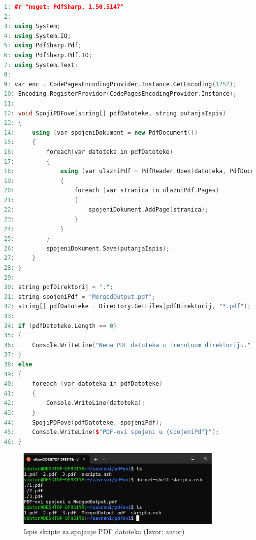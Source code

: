 \documentclass{foi}
\begin{document}
\begin{lstlisting}[language=C++]
1: #r "nuget: PdfSharp, 1.50.5147"
2:
3: using System;
4: using System.IO;
5: using PdfSharp.Pdf;
6: using PdfSharp.Pdf.IO;
7: using System.Text;
8:
9: var enc = CodePagesEncodingProvider.Instance.GetEncoding(1252);
10: Encoding.RegisterProvider(CodePagesEncodingProvider.Instance);
11:
12: void SpojiPDFove(string[] pdfDatoteke, string putanjaIspis)
13: {
14:     using (var spojeniDokument = new PdfDocument())
15:     {
16:         foreach(var datoteka in pdfDatoteke)
17:         {
18:             using (var ulazniPdf = PdfReader.Open(datoteka, PdfDocumentOpenMode.Import))
19:             {
20:                 foreach (var stranica in ulazniPdf.Pages)
21:                 {
22:                     spojeniDokument.AddPage(stranica);
23:                 }
24:             }
25:         }
26:         spojeniDokument.Save(putanjaIspis);
27:     }
28: }
29:
30: string pdfDirektorij = ".";
31: string spojeniPdf = "MergedOutput.pdf";
32: string[] pdfDatoteke = Directory.GetFiles(pdfDirektorij, "*.pdf");
33:
34: if (pdfDatoteke.Length == 0)
35: {
36:     Console.WriteLine("Nema PDF datoteka u trenutnom direktoriju.");
37: }
38: else
39: {
40:     foreach (var datoteka in pdfDatoteke)
41:     {
42:         Console.WriteLine(datoteka);
43:     }
44:     SpojiPDFove(pdfDatoteke, spojeniPdf);
45:     Console.WriteLine($"PDF-ovi spojeni u {spojeniPdf}");
46: }
\end{lstlisting}

\begin{figure}[H]
    \centering
    \includegraphics[width=0.9\textwidth]{slike/pdflinux.png}
    \caption{Ispis skripte za spajanje PDF datoteka (Izvor: autor)}
    \label{fig:pdflinux}
\end{figure}
\end{document}
